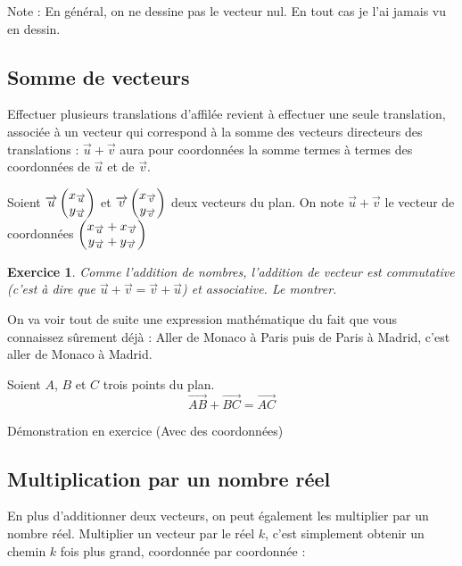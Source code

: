 \documentclass[10pt,a4paper,oneside]{book}
\newtheorem{exo}{Exercice}
\begin{document}
Note : En général, on ne dessine pas le vecteur nul. En tout cas je l'ai jamais vu en dessin.

\subsection{Somme de vecteurs}

Effectuer plusieurs translations d'affilée revient à effectuer une seule translation, associée à un vecteur qui correspond à la somme des vecteurs directeurs des translations : $\overrightarrow{u}+\overrightarrow{v}$ aura pour coordonnées la somme termes à termes des coordonnées de $\overrightarrow{u}$ et de $\overrightarrow{v}$.

\begin{de}
    Soient $\overrightarrow{u}  \begin{pmatrix} x_{\overrightarrow{u}}\\ y_{\overrightarrow{u}} \end{pmatrix}$ et 
    $\overrightarrow{v}  \begin{pmatrix} x_{\overrightarrow{v}}\\ y_{\overrightarrow{v}} \end{pmatrix}$ deux vecteurs du plan. 
    On note $\overrightarrow{u}+\overrightarrow{v}$ le vecteur de coordonnées 
    $ \begin{pmatrix} x_{\overrightarrow{u}}+x_{\overrightarrow{v}}\\ y_{\overrightarrow{u}}+y_{\overrightarrow{v}} \end{pmatrix}$
\end{de}

\begin{exo}
  Comme l'addition de nombres, l'addition de vecteur est commutative (c'est à dire que $\overrightarrow{u}+\overrightarrow{v} = \overrightarrow{v}+\overrightarrow{u}$) et associative. Le montrer.
\end{exo}

On va voir tout de suite une expression mathématique du fait que vous connaissez sûrement déjà : Aller de Monaco à Paris puis de Paris à Madrid, c'est aller de Monaco à Madrid.

\begin{prop}
  Soient $A$, $B$ et $C$ trois points du plan. 
  \[ \overrightarrow{AB} + \overrightarrow{BC} = \overrightarrow{AC}\]
\end{prop}

Démonstration en exercice (Avec des coordonnées)

\subsection{Multiplication par un nombre réel}

En plus d'additionner deux vecteurs, on peut également les multiplier par un nombre réel. Multiplier un vecteur par le réel $k$, c'est simplement obtenir un chemin $k$ fois plus grand, coordonnée par coordonnée :
\end{document}
